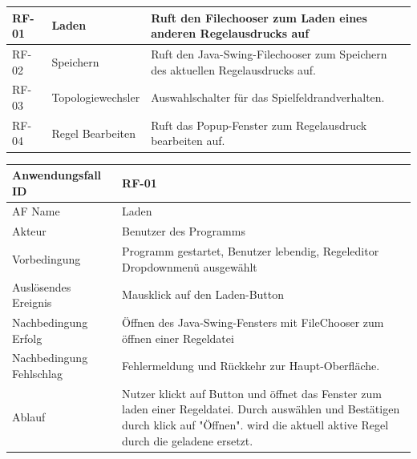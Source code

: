 \documentclass[11pt]{article}
\begin{document}
\begin{longtable}[m]{|m{2cm}|m{4cm}|m{9cm}|} %
        \hline
        RF-01 & Laden & Ruft den Filechooser zum Laden eines anderen Regelausdrucks auf \\
        \hline
        RF-02 & Speichern & Ruft den Java-Swing-Filechooser zum Speichern des aktuellen Regelausdrucks auf. \\
        \hline
        RF-03 & Topologiewechsler & Auswahlschalter für das Spielfeldrandverhalten. \\
        \hline
        RF-04 & Regel Bearbeiten & Ruft das Popup-Fenster zum Regelausdruck bearbeiten auf. \\
        \hline
\end{longtable}
\pagebreak


    \begin{tabular}[m]{|m{7cm}|m{9cm}|}
        \hline
        Anwendungsfall ID     & RF-01 \\ %
        \hline
        AF Name     &  Laden \\
        \hline
        Akteur&Benutzer des Programms \\
        \hline
        Vorbedingung&Programm gestartet, Benutzer lebendig, Regeleditor Dropdownmenü ausgewählt\\
        \hline
        Auslösendes Ereignis&Mausklick auf den Laden-Button\\
        \hline
        Nachbedingung Erfolg&Öffnen des Java-Swing-Fensters mit FileChooser zum öffnen einer Regeldatei\\
        \hline
        Nachbedingung Fehlschlag&Fehlermeldung und Rückkehr zur Haupt-Oberfläche.\\
        \hline
        Ablauf&Nutzer klickt auf Button und öffnet das Fenster zum laden einer Regeldatei. Durch auswählen und Bestätigen durch klick auf "Öffnen". wird die aktuell aktive Regel durch die geladene ersetzt.\\
        \hline
    \end{tabular}
    \par
    
\end{document}
